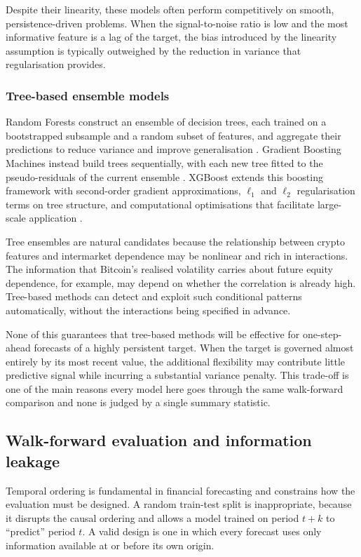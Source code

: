 Despite their linearity, these models often perform competitively on smooth, persistence-driven problems. When the signal-to-noise ratio is low and the most informative feature is a lag of the target, the bias introduced by the linearity assumption is typically outweighed by the reduction in variance that regularisation provides.

\subsubsection{Tree-based ensemble models}

Random Forests construct an ensemble of decision trees, each trained on a bootstrapped subsample and a random subset of features, and aggregate their predictions to reduce variance and improve generalisation \cite{breiman2001}. Gradient Boosting Machines instead build trees sequentially, with each new tree fitted to the pseudo-residuals of the current ensemble \cite{friedman2001}. XGBoost extends this boosting framework with second-order gradient approximations, $\ell_1$ and $\ell_2$ regularisation terms on tree structure, and computational optimisations that facilitate large-scale application \cite{chen2016}.

Tree ensembles are natural candidates because the relationship between crypto features and intermarket dependence may be nonlinear and rich in interactions. The information that Bitcoin's realised volatility carries about future equity dependence, for example, may depend on whether the correlation is already high. Tree-based methods can detect and exploit such conditional patterns automatically, without the interactions being specified in advance.

None of this guarantees that tree-based methods will be effective for one-step-ahead forecasts of a highly persistent target. When the target is governed almost entirely by its most recent value, the additional flexibility may contribute little predictive signal while incurring a substantial variance penalty. This trade-off is one of the main reasons every model here goes through the same walk-forward comparison and none is judged by a single summary statistic.

\subsection{Walk-forward evaluation and information leakage}

Temporal ordering is fundamental in financial forecasting and constrains how the evaluation must be designed. A random train-test split is inappropriate, because it disrupts the causal ordering and allows a model trained on period $t + k$ to ``predict'' period $t$. A valid design is one in which every forecast uses only information available at or before its own origin.

